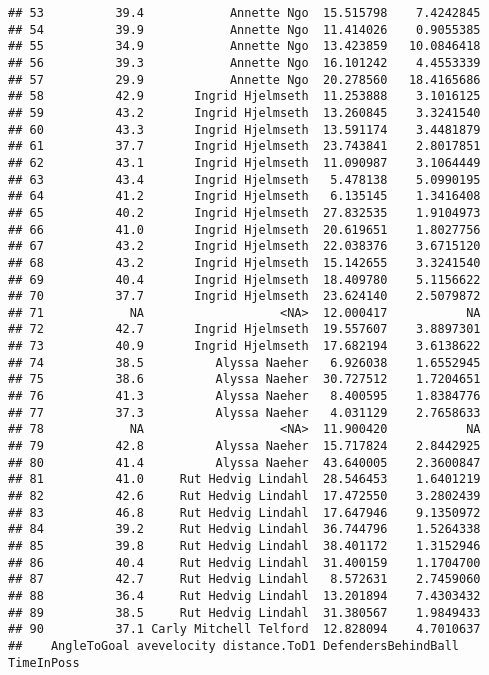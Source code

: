 \documentclass[]{article}
\begin{document}
\begin{verbatim}
## 53          39.4            Annette Ngo  15.515798    7.4242845
## 54          39.9            Annette Ngo  11.414026    0.9055385
## 55          34.9            Annette Ngo  13.423859   10.0846418
## 56          39.3            Annette Ngo  16.101242    4.4553339
## 57          29.9            Annette Ngo  20.278560   18.4165686
## 58          42.9       Ingrid Hjelmseth  11.253888    3.1016125
## 59          43.2       Ingrid Hjelmseth  13.260845    3.3241540
## 60          43.3       Ingrid Hjelmseth  13.591174    3.4481879
## 61          37.7       Ingrid Hjelmseth  23.743841    2.8017851
## 62          43.1       Ingrid Hjelmseth  11.090987    3.1064449
## 63          43.4       Ingrid Hjelmseth   5.478138    5.0990195
## 64          41.2       Ingrid Hjelmseth   6.135145    1.3416408
## 65          40.2       Ingrid Hjelmseth  27.832535    1.9104973
## 66          41.0       Ingrid Hjelmseth  20.619651    1.8027756
## 67          43.2       Ingrid Hjelmseth  22.038376    3.6715120
## 68          43.2       Ingrid Hjelmseth  15.142655    3.3241540
## 69          40.4       Ingrid Hjelmseth  18.409780    5.1156622
## 70          37.7       Ingrid Hjelmseth  23.624140    2.5079872
## 71            NA                   <NA>  12.000417           NA
## 72          42.7       Ingrid Hjelmseth  19.557607    3.8897301
## 73          40.9       Ingrid Hjelmseth  17.682194    3.6138622
## 74          38.5          Alyssa Naeher   6.926038    1.6552945
## 75          38.6          Alyssa Naeher  30.727512    1.7204651
## 76          41.3          Alyssa Naeher   8.400595    1.8384776
## 77          37.3          Alyssa Naeher   4.031129    2.7658633
## 78            NA                   <NA>  11.900420           NA
## 79          42.8          Alyssa Naeher  15.717824    2.8442925
## 80          41.4          Alyssa Naeher  43.640005    2.3600847
## 81          41.0     Rut Hedvig Lindahl  28.546453    1.6401219
## 82          42.6     Rut Hedvig Lindahl  17.472550    3.2802439
## 83          46.8     Rut Hedvig Lindahl  17.647946    9.1350972
## 84          39.2     Rut Hedvig Lindahl  36.744796    1.5264338
## 85          39.8     Rut Hedvig Lindahl  38.401172    1.3152946
## 86          40.4     Rut Hedvig Lindahl  31.400159    1.1704700
## 87          42.7     Rut Hedvig Lindahl   8.572631    2.7459060
## 88          36.4     Rut Hedvig Lindahl  13.201894    7.4303432
## 89          38.5     Rut Hedvig Lindahl  31.380567    1.9849433
## 90          37.1 Carly Mitchell Telford  12.828094    4.7010637
##    AngleToGoal avevelocity distance.ToD1 DefendersBehindBall TimeInPoss

\end{verbatim}
\end{document}

